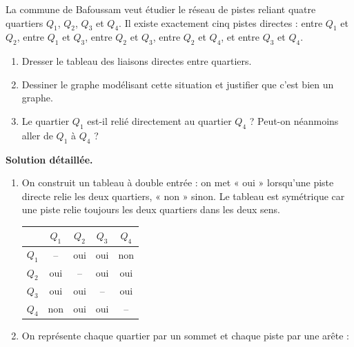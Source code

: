 \documentclass[11pt]{article}
\begin{document}
\begin{exoresolu}
La commune de Bafoussam veut étudier le réseau de pistes reliant quatre quartiers $Q_1$, $Q_2$, $Q_3$ et $Q_4$. Il existe exactement cinq pistes directes : entre $Q_1$ et $Q_2$, entre $Q_1$ et $Q_3$, entre $Q_2$ et $Q_3$, entre $Q_2$ et $Q_4$, et entre $Q_3$ et $Q_4$.
\begin{enumerate}
\item Dresser le tableau des liaisons directes entre quartiers.
\item Dessiner le graphe modélisant cette situation et justifier que c'est bien un graphe.
\item Le quartier $Q_1$ est-il relié directement au quartier $Q_4$ ? Peut-on néanmoins aller de $Q_1$ à $Q_4$ ?
\end{enumerate}
\tcblower
\textbf{Solution détaillée.}
\begin{enumerate}
\item On construit un tableau à double entrée : on met « oui » lorsqu'une piste directe relie les deux quartiers, « non » sinon. Le tableau est symétrique car une piste relie toujours les deux quartiers dans les deux sens.
\begin{center}
\begin{tabular}{|c|c|c|c|c|}
\hline
\rowcolor{popblueL} & $Q_1$ & $Q_2$ & $Q_3$ & $Q_4$ \\
\hline
$Q_1$ & -- & oui & oui & non \\
\hline
$Q_2$ & oui & -- & oui & oui \\
\hline
$Q_3$ & oui & oui & -- & oui \\
\hline
$Q_4$ & non & oui & oui & -- \\
\hline
\end{tabular}
\end{center}
\item On représente chaque quartier par un sommet et chaque piste par une arête :
\begin{center}

\end{center}
\end{enumerate}
\end{exoresolu}
\end{document}
